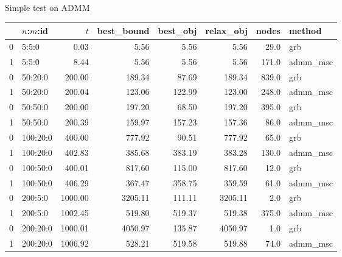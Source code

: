 \begin{frame}{Simple test on ADMM}
  \begin{tabular}{llrrrrrl}
    \toprule
    {} & $n$:$m$:id & $t$     & best\_bound & best\_obj & relax\_obj & nodes & method    \\
    \midrule
    0  & 5:5:0      & 0.03    & 5.56        & 5.56      & 5.56       & 29.0  & grb       \\
    1  & 5:5:0      & 8.44    & 5.56        & 5.56      & 5.56       & 171.0 & admm\_msc \\
    0  & 50:20:0    & 200.00  & 189.34      & 87.69     & 189.34     & 839.0 & grb       \\
    1  & 50:20:0    & 200.04  & 123.06      & 122.99    & 123.00     & 248.0 & admm\_msc \\
    0  & 50:50:0    & 200.00  & 197.20      & 68.50     & 197.20     & 395.0 & grb       \\
    1  & 50:50:0    & 200.39  & 159.97      & 157.23    & 157.36     & 86.0  & admm\_msc \\
    0  & 100:20:0   & 400.00  & 777.92      & 90.51     & 777.92     & 65.0  & grb       \\
    1  & 100:20:0   & 402.83  & 385.68      & 383.19    & 383.28     & 130.0 & admm\_msc \\
    0  & 100:50:0   & 400.01  & 817.60      & 115.00    & 817.60     & 12.0  & grb       \\
    1  & 100:50:0   & 406.29  & 367.47      & 358.75    & 359.59     & 61.0  & admm\_msc \\
    0  & 200:5:0    & 1000.00 & 3205.11     & 111.11    & 3205.11    & 2.0   & grb       \\
    1  & 200:5:0    & 1002.45 & 519.80      & 519.37    & 519.38     & 375.0 & admm\_msc \\
    0  & 200:20:0   & 1000.01 & 4050.97     & 135.87    & 4050.97    & 1.0   & grb       \\
    1  & 200:20:0   & 1006.92 & 528.21      & 519.58    & 519.88     & 74.0  & admm\_msc \\
    \bottomrule
  \end{tabular}
\end{frame}
\begin{frame}
  \scriptsize
  \printbibliography
\end{frame}
